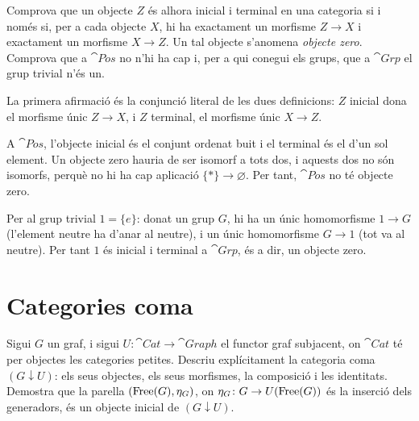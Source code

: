 \begin{exercici}
Comprova que un objecte $Z$ és alhora inicial i terminal en una categoria si i només si, per a cada objecte $X$, hi ha exactament un morfisme $Z\to X$ i exactament un morfisme $X\to Z$. Un tal objecte s'anomena \emph{objecte zero}. Comprova que a $\cat{Pos}$ no n'hi ha cap i, per a qui conegui els grups, que a $\cat{Grp}$ el grup trivial n'és un.
\end{exercici}

\begin{solucio}
La primera afirmació és la conjunció literal de les dues definicions: $Z$ inicial dona el morfisme únic $Z\to X$, i $Z$ terminal, el morfisme únic $X\to Z$.

A $\cat{Pos}$, l'objecte inicial és el conjunt ordenat buit i el terminal és el d'un sol element. Un objecte zero hauria de ser isomorf a tots dos, i aquests dos no són isomorfs, perquè no hi ha cap aplicació $\{\ast\}\to\varnothing$. Per tant, $\cat{Pos}$ no té objecte zero.

Per al grup trivial $1=\{e\}$: donat un grup $G$, hi ha un únic homomorfisme $1\to G$ (l'element neutre ha d'anar al neutre), i un únic homomorfisme $G\to 1$ (tot va al neutre). Per tant $1$ és inicial i terminal a $\cat{Grp}$, és a dir, un objecte zero.
\end{solucio}

\section{Categories coma}

\begin{exercici}\label{pr-coma-lliure}
Sigui $G$ un graf, i sigui $U\colon\cat{Cat}\to\cat{Graph}$ el functor graf subjacent, on $\cat{Cat}$ té per objectes les categories petites. Descriu explícitament la categoria coma $(G\downarrow U)$: els seus objectes, els seus morfismes, la composició i les identitats. Demostra que la parella $(\operatorname{Free}(G),\eta_G)$, on $\eta_G\colon G\to U(\operatorname{Free}(G))$ és la inserció dels generadors, és un objecte inicial de $(G\downarrow U)$.
\end{exercici}


